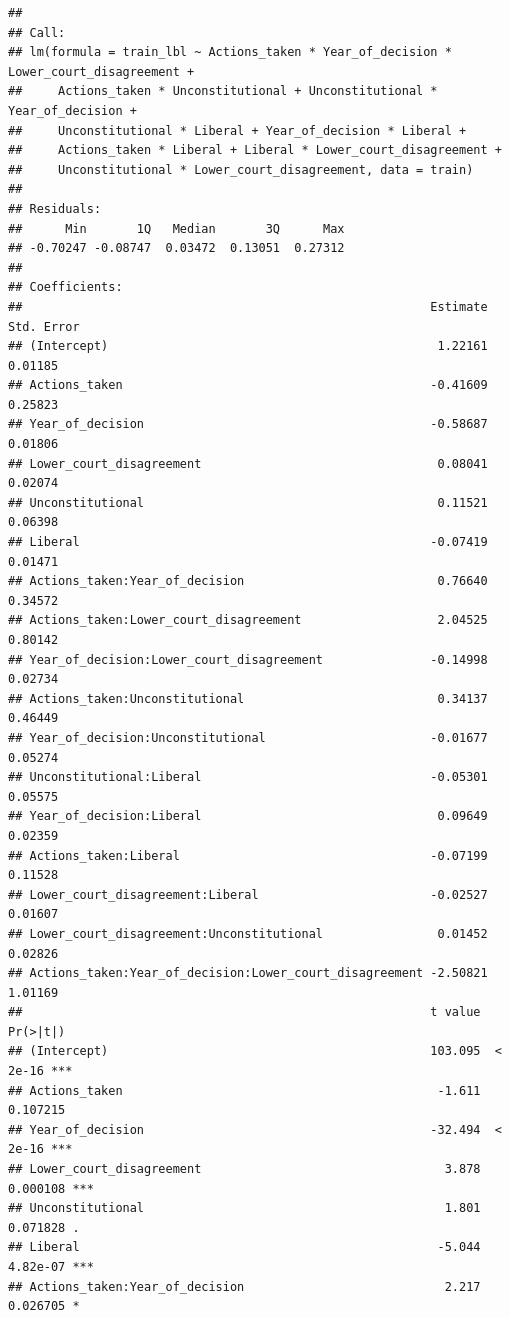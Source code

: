 \documentclass[
]{article}
\begin{document}
\begin{verbatim}
## 
## Call:
## lm(formula = train_lbl ~ Actions_taken * Year_of_decision * Lower_court_disagreement + 
##     Actions_taken * Unconstitutional + Unconstitutional * Year_of_decision + 
##     Unconstitutional * Liberal + Year_of_decision * Liberal + 
##     Actions_taken * Liberal + Liberal * Lower_court_disagreement + 
##     Unconstitutional * Lower_court_disagreement, data = train)
## 
## Residuals:
##      Min       1Q   Median       3Q      Max 
## -0.70247 -0.08747  0.03472  0.13051  0.27312 
## 
## Coefficients:
##                                                         Estimate Std. Error
## (Intercept)                                              1.22161    0.01185
## Actions_taken                                           -0.41609    0.25823
## Year_of_decision                                        -0.58687    0.01806
## Lower_court_disagreement                                 0.08041    0.02074
## Unconstitutional                                         0.11521    0.06398
## Liberal                                                 -0.07419    0.01471
## Actions_taken:Year_of_decision                           0.76640    0.34572
## Actions_taken:Lower_court_disagreement                   2.04525    0.80142
## Year_of_decision:Lower_court_disagreement               -0.14998    0.02734
## Actions_taken:Unconstitutional                           0.34137    0.46449
## Year_of_decision:Unconstitutional                       -0.01677    0.05274
## Unconstitutional:Liberal                                -0.05301    0.05575
## Year_of_decision:Liberal                                 0.09649    0.02359
## Actions_taken:Liberal                                   -0.07199    0.11528
## Lower_court_disagreement:Liberal                        -0.02527    0.01607
## Lower_court_disagreement:Unconstitutional                0.01452    0.02826
## Actions_taken:Year_of_decision:Lower_court_disagreement -2.50821    1.01169
##                                                         t value Pr(>|t|)    
## (Intercept)                                             103.095  < 2e-16 ***
## Actions_taken                                            -1.611 0.107215    
## Year_of_decision                                        -32.494  < 2e-16 ***
## Lower_court_disagreement                                  3.878 0.000108 ***
## Unconstitutional                                          1.801 0.071828 .  
## Liberal                                                  -5.044 4.82e-07 ***
## Actions_taken:Year_of_decision                            2.217 0.026705 *  

\end{verbatim}
\end{document}
